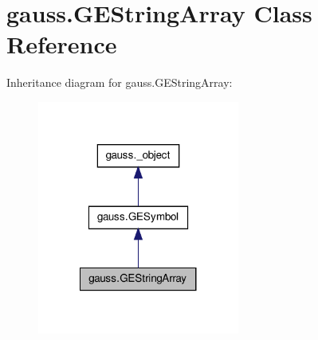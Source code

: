 \hypertarget{classgauss_1_1_g_e_string_array}{\section{gauss.\-G\-E\-String\-Array Class Reference}
\label{classgauss_1_1_g_e_string_array}
}


Inheritance diagram for gauss.\-G\-E\-String\-Array\-:\nopagebreak
\begin{figure}[H]
\begin{center}
\leavevmode
\includegraphics[width=188pt]{classgauss_1_1_g_e_string_array__inherit__graph}
\end{center}
\end{figure}
